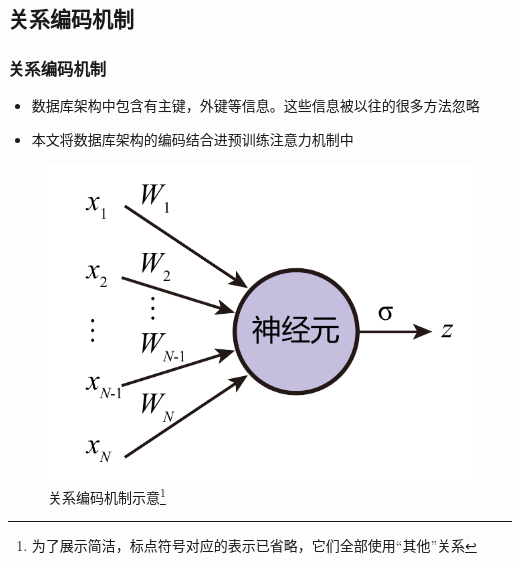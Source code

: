 \documentclass{ctexbeamer}
\begin{document}
\subsection{关系编码机制}
\begin{frame}
  \frametitle{关系编码机制}
  \begin{itemize}
    \item 数据库架构中包含有主键，外键等信息。这些信息被以往的很多方法忽略
    \item 本文将数据库架构的编码结合进预训练注意力机制中
  \end{itemize}

  \begin{figure}
    \includegraphics[page=10,width=\textwidth]{figure/figures.pdf}
    \caption{关系编码机制示意\footnote{为了展示简洁，标点符号对应的表示已省略，它们全部使用“其他”关系}}
  \end{figure}
\end{frame}
\end{document}
